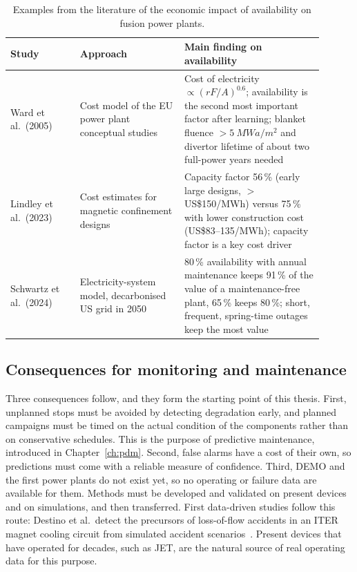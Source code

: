 \documentclass{book}
\begin{document}
\begin{table}[htbp]
  \centering
  \small
  \caption{Examples from the literature of the economic impact of
  availability on fusion power plants.}
  \label{tab:availability_economics}
  \begin{tabular}{p{0.2\linewidth}p{0.3\linewidth}p{0.4\linewidth}}
    \hline
    Study & Approach & Main finding on availability \\
    \hline
    Ward et al.~(2005)~\cite{ward2005economic} &
    Cost model of the EU power plant conceptual studies &
    Cost of electricity $\propto (rF/A)^{0.6}$; availability is the second
    most important factor after learning; blanket fluence
    $>\SI{5}{MWa/m^2}$ and divertor lifetime of about two full-power years
    needed \\[3pt]
    Lindley et al.~(2023)~\cite{Lindley2023} &
    Cost estimates for magnetic confinement designs &
    Capacity factor 56\,\% (early large designs, $>$US\$150/MWh) versus
    75\,\% with lower construction cost (US\$83--135/MWh); capacity factor
    is a key cost driver \\[3pt]
    Schwartz et al.~(2024)~\cite{schwartz2024maintenance} &
    Electricity-system model, decarbonised US grid in 2050 &
    80\,\% availability with annual maintenance keeps 91\,\% of the value
    of a maintenance-free plant, 65\,\% keeps 80\,\%; short, frequent,
    spring-time outages keep the most value \\
    \hline
  \end{tabular}
\end{table}

\subsection{Consequences for monitoring and maintenance}

Three consequences follow, and they form the starting point of this thesis.
First, unplanned stops must be avoided by detecting degradation early, and
planned campaigns must be timed on the actual condition of the components
rather than on conservative schedules. This is the purpose of predictive
maintenance, introduced in Chapter~\ref{ch:pdm}. Second, false alarms have a
cost of their own, so predictions must come with a reliable measure of
confidence. Third, DEMO and the first power plants do not exist yet, so no
operating or failure data are available for them. Methods must be developed
and validated on present devices and on simulations, and then transferred.
First data-driven studies follow this route: Destino et al.\ detect the
precursors of loss-of-flow accidents in an ITER magnet cooling circuit from
simulated accident scenarios~\cite{destino2021lofa}. Present devices that have
operated for decades, such as JET, are the natural source of real operating
data for this purpose.
\end{document}

